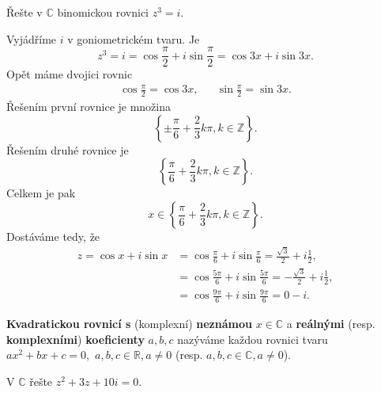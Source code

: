 \begin{priklad}
Řešte v $\mathbb C$ binomickou rovnici $z^3=i.$
\end{priklad}

\begin{reseni}
Vyjádříme $i$ v goniometrickém tvaru. Je
$$
    z^3 = i = \cos \frac{\pi}{2} + i\sin \frac{\pi}{2} = \cos 3x + i \sin 3x.
$$
Opět máme dvojici rovnic
\begin{align*}
	\cos \frac{\pi }{2} = \cos 3x, && \sin \frac{\pi }{2} = \sin 3x.
\end{align*}
Řešením první rovnice je množina
$$
\left \{ \pm \frac{\pi }{6} + \frac{2}{3} k \pi, k \in \mathbb Z  \right \} .
$$
Řešením druhé rovnice je
$$
\left \{ \frac{\pi}{6} +\frac{2}{3} k\pi, k \in \mathbb Z  \right \} .
$$
Celkem je pak
$$
    x \in \left \{ \frac{\pi}{6} + \frac{2}{3} k \pi, k \in \mathbb Z  \right \} .
$$
Dostáváme tedy, že
\begin{align*}
	z =  \cos x + i \sin x &= \cos \frac{\pi}{6} + i \sin \frac{\pi }{6} = \frac{\sqrt{3}}{2} + i \frac{1}{2}, \\
	&= \cos \frac{5\pi }{6} + i \sin \frac{5\pi }{6} = -\frac{\sqrt{3}}{2} + i \frac{1}{2},\\
	&= \cos \frac{9\pi}{6} + i \sin \frac{9\pi }{6} = 0 - i.
\end{align*}
\end{reseni}

\begin{definition}
\textbf{Kvadratickou rovnicí s} (komplexní) \textbf{neznámou} $x\in \mathbb C$ a
\textbf{reálnými} (resp. \textbf{komplexními}) \textbf{koeficienty} $a,b,c$
nazýváme každou rovnici tvaru
$ax^2+bx+c=0,$ $a,b,c\in \mathbb R,a\ne0$ (resp. $a,b,c \in \mathbb C,a\ne 0$).
\end{definition}

\begin{priklad}
V $\mathbb C$ řešte $z^2+3z+10i=0.$
\end{priklad}


